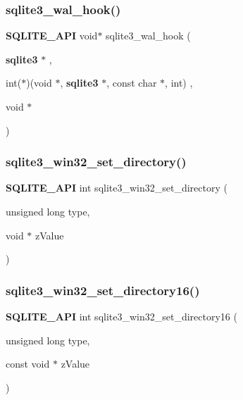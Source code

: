 \subsubsection{sqlite3\_wal\_hook()}
{\footnotesize\ttfamily \textbf{ S\+Q\+L\+I\+T\+E\+\_\+\+A\+PI} void$\ast$ sqlite3\+\_\+wal\+\_\+hook (\begin{DoxyParamCaption}\item[{\textbf{ sqlite3} $\ast$}]{,  }\item[{int($\ast$)(void $\ast$, \textbf{ sqlite3} $\ast$, const char $\ast$, int)}]{,  }\item[{void $\ast$}]{ }\end{DoxyParamCaption})}

\mbox{\label{sqlite3_8h_ad68834fcb475fa407b91ebeca90839c6}} 
\subsubsection{sqlite3\_win32\_set\_directory()}
{\footnotesize\ttfamily \textbf{ S\+Q\+L\+I\+T\+E\+\_\+\+A\+PI} int sqlite3\+\_\+win32\+\_\+set\+\_\+directory (\begin{DoxyParamCaption}\item[{unsigned long}]{type,  }\item[{void $\ast$}]{z\+Value }\end{DoxyParamCaption})}

\mbox{\label{sqlite3_8h_abc7b03bb0c974d3ee525f4ed9bab2d10}} 
\subsubsection{sqlite3\_win32\_set\_directory16()}
{\footnotesize\ttfamily \textbf{ S\+Q\+L\+I\+T\+E\+\_\+\+A\+PI} int sqlite3\+\_\+win32\+\_\+set\+\_\+directory16 (\begin{DoxyParamCaption}\item[{unsigned long}]{type,  }\item[{const void $\ast$}]{z\+Value }\end{DoxyParamCaption})}

\mbox{\label{sqlite3_8h_ac5d01723efda6b0363dca69bde0ee8f0}} 
